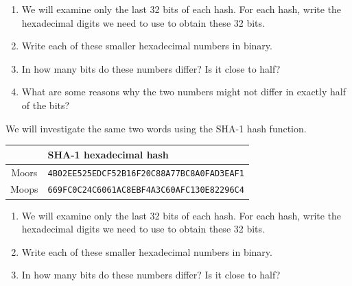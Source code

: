 \documentclass{book}
\theoremstyle{plain}
\theoremstyle{definition}
\newif\ifprintsolutions
\newcommand{\solution}[1]{\ifprintsolutions \begin{sloppypar}{\it #1}\end{sloppypar} \fi} %
\begin{document}
\begin{enumerate}
\item We will examine only the last 32 bits of each hash. For each hash, write the hexadecimal digits we need to use to obtain these 32 bits. \solution{Since four bits correspond to a hexadecimal digit, we need eight digits of each hash, giving \texttt{A2BC8B03} and \texttt{41C2F455}.}
\item Write each of these smaller hexadecimal numbers in binary. \solution{\texttt{A2BC8B03 = 10100010 10111100 10001011 00000011}$_2$ \\ \texttt{41C2F455 = 01000001 11000010 11110100 01010101}$_2$}
\item In how many bits do these numbers differ? Is it close to half? \solution{They differ in 22 bits. This is about $60\%$ of the bits.}
\item What are some reasons why the two numbers might not differ in exactly half of the bits? \solution{We only checked a portion of the hash bits; the words we chose are not very long; the ``half of all bits" principle is statistical, not absolute.}
\end{enumerate}

We will investigate the same two words using the SHA-1 hash function.

\begin{center}
\begin{tabular}{cl}
& SHA-1 hexadecimal hash \\
\hline
Moors & \texttt{4B02EE525EDCF52B16F20C88A77BC8A0FAD3EAF1} \\
Moops & \texttt{669FC0C24C6061AC8EBF4A3C60AFC130E82296C4}
\end{tabular}
\end{center}

\begin{enumerate}
\item We will examine only the last 32 bits of each hash. For each hash, write the hexadecimal digits we need to use to obtain these 32 bits. \solution{We use \texttt{FAD3EAF1} and \texttt{E82296C4}.}
\item Write each of these smaller hexadecimal numbers in binary. \solution{\texttt{FAD3EAF1 = 11111010 11010011 11101010 11110001}$_2$ \\ \texttt{E82296C4 = 11101000 00100010 10010110 11000100}$_2$}
\item In how many bits do these numbers differ? Is it close to half? \solution{They differ in $16$ bits. This is exactly half of the bits.}
\end{enumerate}
\end{document}
